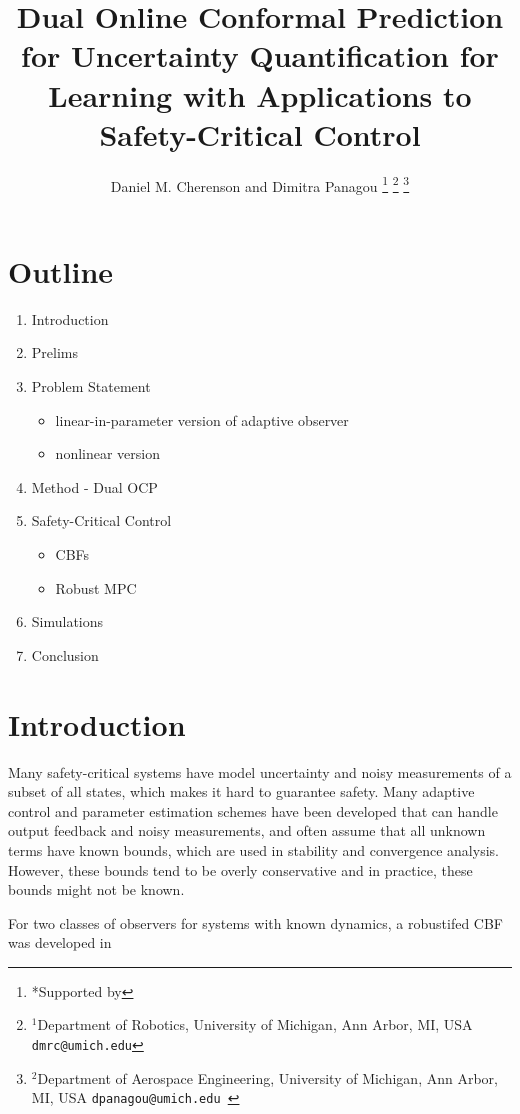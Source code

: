 \documentclass[letterpaper, 10 pt, conference]{ieeeconf}  %
\title{\LARGE \bf Dual Online Conformal Prediction for Uncertainty Quantification for  Learning with Applications to Safety-Critical Control
}
\author{Daniel M. Cherenson and Dimitra Panagou
\thanks{*Supported by }%
\thanks{$^{1}$Department of Robotics,
        University of Michigan, Ann Arbor, MI, USA
        {\tt\small dmrc@umich.edu}}%
\thanks{$^{2}$Department of Aerospace Engineering,
        University of Michigan, Ann Arbor, MI, USA
        {\tt\small dpanagou@umich.edu }}%
}
\begin{document}
\maketitle
\begin{abstract}
    
\end{abstract}

\section{Outline}
\begin{enumerate}
    \item Introduction
    \item Prelims
    \item Problem Statement
    \begin{itemize}
        \item linear-in-parameter version of adaptive observer
        \item nonlinear version
    \end{itemize}
    \item Method - Dual OCP
    \item Safety-Critical Control
    \begin{itemize}
        \item CBFs
        \item Robust MPC
    \end{itemize}
    \item Simulations
    \item Conclusion

\end{enumerate}

\section{Introduction}

Many safety-critical systems have model uncertainty and noisy measurements of a subset of all states, which makes it hard to guarantee safety. Many adaptive control and parameter estimation schemes have been developed that can handle output feedback and noisy measurements, and often assume that all unknown terms have known bounds, which are used in stability and convergence analysis. However, these bounds tend to be overly conservative and in practice, these bounds might not be known.

For two classes of observers for systems with known dynamics, a robustifed CBF was developed in~\cite{agrawal2022safe}
\end{document}
